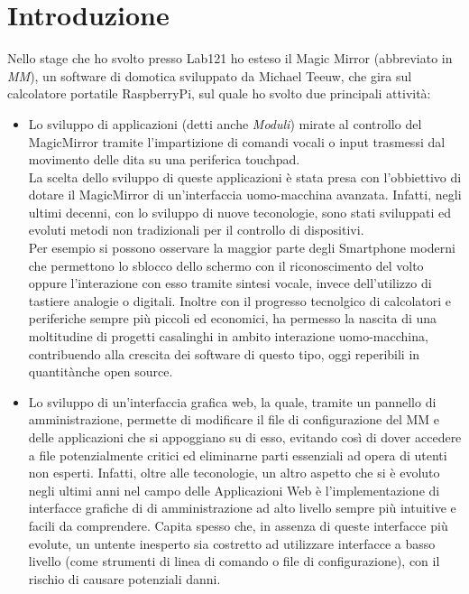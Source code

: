 \chapter{Introduzione}

Nello stage che ho svolto presso Lab121 ho esteso il Magic Mirror (abbreviato in \emph{MM}), un software di domotica sviluppato da Michael Teeuw,
che gira sul calcolatore portatile RaspberryPi\cite{Raspberry}, sul quale ho svolto due principali attivit\`a:\\
\begin{itemize}
\item Lo sviluppo di applicazioni (detti anche \emph{Moduli}) mirate al controllo del
MagicMirror tramite l'impartizione di comandi vocali o input trasmessi dal movimento delle dita su
una periferica touchpad.\\
La scelta dello sviluppo di queste applicazioni è stata presa con l'obbiettivo di dotare il
MagicMirror di un'interfaccia uomo-macchina avanzata. Infatti, negli ultimi decenni, con lo sviluppo
di nuove teconologie, sono stati sviluppati ed evoluti metodi non tradizionali per il controllo di dispositivi.\\
Per esempio si possono osservare la maggior parte degli Smartphone moderni che permettono lo sblocco dello schermo con
il riconoscimento del volto oppure l'interazione con esso tramite sintesi vocale,
invece dell'utilizzo di tastiere analogie o digitali.
Inoltre con il progresso tecnolgico di calcolatori e periferiche sempre pi\`u piccoli ed economici, ha permesso
la nascita di una moltitudine di progetti casalinghi in ambito interazione uomo-macchina, contribuendo
alla crescita dei software di questo tipo, oggi reperibili in quantit\` anche open source.\\[1\baselineskip]
\item Lo sviluppo di un'interfaccia grafica web, la quale, tramite un pannello di amministrazione,
 permette di modificare il file di configurazione del MM e delle applicazioni che si appoggiano su di esso,
evitando così di dover accedere
a file potenzialmente critici ed eliminarne parti essenziali ad opera di utenti non esperti.
Infatti, oltre alle teconologie, un altro aspetto che si \`e evoluto negli ultimi anni
nel campo delle Applicazioni Web è l'implementazione di interfacce grafiche di di amministrazione
ad alto livello sempre pi\`u intuitive e facili da comprendere.
Capita spesso che, in assenza di queste interfacce più evolute, un untente inesperto sia
costretto ad utilizzare interfacce a basso livello (come strumenti di linea di comando o file
di configurazione), con il rischio di causare potenziali danni.\\[2\baselineskip]
\end{itemize}

